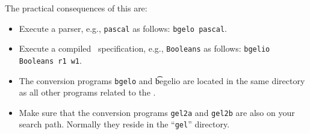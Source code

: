 \noindent The practical consequences of this are:
\begin{itemize}
\item Execute a parser, e.g., {\tt pascal} as follows: {\tt bgelo pascal}.
\item Execute a compiled \ASFSDF\ specification, e.g., {\tt Booleans} as follows:
{\tt bgelio Booleans r1 w1}.
\item The conversion programs {\tt bgelo} and {\t begelio} are located in the
same directory as all other programs related to the \TB.
\item Make sure that the conversion programs {\tt gel2a} and {\tt gel2b} are also
on your search path. Normally they reside in the ``{\tt gel}'' directory.
\end{itemize}
